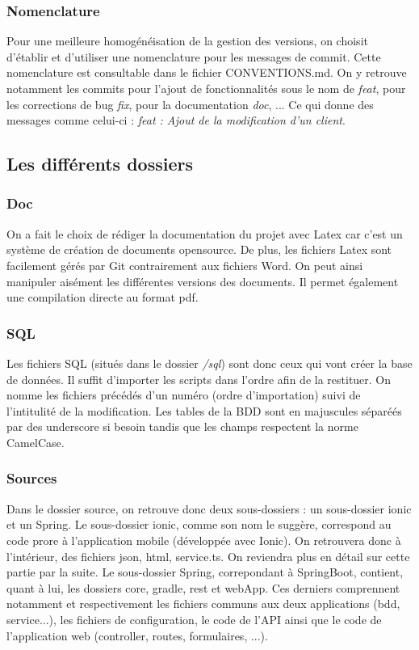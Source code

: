			\subsubsection{Nomenclature}

				Pour une meilleure homogénéisation de la gestion des versions, on choisit d'établir et d'utiliser une nomenclature pour les messages de commit. Cette nomenclature est consultable dans le fichier CONVENTIONS.md.\newline
				On y retrouve notamment les commits pour l'ajout de fonctionnalités sous le nom de  \textit{feat}, pour les corrections de bug  \textit{fix}, pour la documentation  \textit{doc}, ...
				Ce qui donne des messages comme celui-ci :  \textit{feat : Ajout de la modification d'un client}.


		\subsection{Les différents dossiers}
			\subsubsection{Doc}

				On a fait le choix de rédiger la documentation du projet avec Latex car c'est un système de création de documents opensource. De plus, les fichiers Latex sont facilement gérés par Git contrairement aux fichiers Word. On peut ainsi manipuler aisément les différentes versions des documents. Il permet également une compilation directe au format pdf.

			\subsubsection{SQL}

			Les fichiers SQL (situés dans le dossier  \textit{/sql}) sont donc ceux qui vont créer la base de données. Il suffit d'importer les scripts dans l'ordre afin de la restituer. On nomme les fichiers précédés d'un numéro (ordre d'importation) suivi de l'intitulité de la modification. Les tables de la BDD sont en majuscules séparéés par des underscore si besoin tandis que les champs respectent la norme CamelCase.

			\subsubsection{Sources}

				Dans le dossier source, on retrouve donc deux sous-dossiers : un sous-dossier ionic et un Spring.
				Le sous-dossier ionic, comme son nom le suggère, correspond au code prore à l'application mobile (développée avec Ionic). On retrouvera donc à l'intérieur, des fichiers json, html, service.ts. On reviendra plus en détail sur cette partie par la suite.
				Le sous-dossier Spring, correpondant à SpringBoot, contient, quant à lui, les dossiers core, gradle, rest et webApp. Ces derniers comprennent notamment et respectivement les fichiers communs aux deux applications (bdd, service...), les fichiers de configuration, le code de l'API ainsi que le code de l'application web (controller, routes, formulaires, ...).

